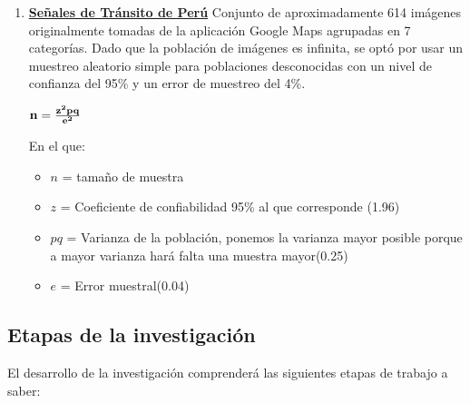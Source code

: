 		
		
		\begin{enumerate}
			\item[]  {\bf \underline {Señales de Tránsito de Perú}}\newline
			Conjunto de aproximadamente 614 imágenes originalmente tomadas de la aplicación Google Maps agrupadas en 7 categorías. Dado que la población de imágenes es infinita, se optó por usar un muestreo aleatorio simple para poblaciones desconocidas con un nivel de confianza del 95\% y un error de muestreo del 4\%.
		
			\vskip 0.4cm
			\begingroup\makeatletter{}\check@mathfonts
			\begin{center}
				${\bf n} ={\bf \frac{z^2pq}{e^2}}$
			\end{center}
			\endgroup
		
			En el que:\vskip 0.1cm
			\begin{itemize}
				\item $n$ = tamaño de muestra
				\item $z$ = Coeficiente de confiabilidad 95\% al que corresponde (1.96)
				\item $pq$ = Varianza de la población, ponemos la varianza mayor posible porque a mayor varianza hará falta una muestra mayor(0.25)
				\item $e$ = Error muestral(0.04)
			\end{itemize}
		\end{enumerate}

\subsection{Etapas de la investigación} 
	El desarrollo de la investigación comprenderá las siguientes etapas de trabajo a saber:

